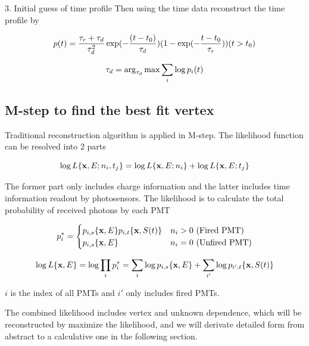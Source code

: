 \documentclass{article}
\begin{document}
\par 3. Initial guess of  time profile
	Then using the time data reconstruct the time profile by

	\begin{equation}
		\numberwithin{equation}{section}
		p(t) =  \frac{\tau_r+\tau_d}{\tau_d^2} \exp (-\frac{(t-t_0)}{\tau_d})(1-\exp(-\frac{t-t_0}{\tau_r})) (t > t_0)
	\end{equation}

	\begin{equation}
		\numberwithin{equation}{section}
		\tau_d = \arg_{\tau_d}\max{\sum_i \log p_i(t)}
	\end{equation}

\subsection{M-step to find the best fit vertex}
	\par Traditional reconstruction algorithm is applied in M-step. The likelihood function can be resolved into 2 parts
	
	\begin{equation}
		\numberwithin{equation}{section}
		\log L\{\textbf{x},E;n_i,t_j\} = \log L\{\textbf{x},E;n_i\}+\log L\{\textbf{x},E;t_j\}
	\end{equation}
	
	\par  The former part only includes charge information and the latter includes time information readout by photosensors. The likelihood is to calculate the total probability of received photons by each PMT 

	\begin{equation}
	\numberwithin{equation}{section}
	p^*_i =  
		\begin{cases}
 		p_{i,s}\{${\textbf x}$,E\} p_{i,t}\{${\textbf x}$,S(t)\}& \text{$n_i > 0$ (Fired PMT)}\\
 		p_{i,s}\{${\textbf x}$,E\} & \text{$n_i=0$ (Unfired PMT)}
		\end{cases}
	\end{equation}
	
	\begin{equation}
		\numberwithin{equation}{section}
		\log L\{\textbf{x},E\} = \log \prod_{i} p^*_i = 	\sum_{i}\log p_{i,s}\{\textbf{x},E\} +\sum_{i'}\log p_{i',t}\{\textbf{x},S(t)\} 
	\end{equation}
	
	\par $i$ is the index of all PMTs and $i'$ only includes fired PMTs.   
	\par The combined likelihood includes vertex and unknown dependence, which will be reconstructed by maximize the likelihood, and we will derivate detailed form from abstract to a calculative one in the following section.
	
\end{document}
